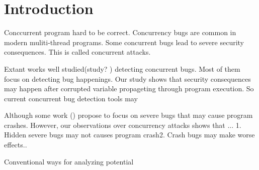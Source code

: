\section{Introduction} \label{sec:intro}


Conccurrent program hard to be correct. Concurrency bugs are common in modern muliti-thread programs. 
Some concurrent bugs lead to severe security consequences. This is called concurrent attacks.


Extant works well studied(study? ) detecting concurrent bugs. Most of them focus on detecting 
bug happenings. Our study shows that security consequences may happen after corrupted variable 
propageting through program execution. So current concurrent bug detection tools may 

Although some work (\conmem) propose to focus on severe bugs that may cause program crashes. 
However, our observations over \observenum concurrency attacks shows that ... 1. Hidden severe bugs may not causes program crash2. Crash bugs may make worse effects..






Conventional ways for analyzing potential 




